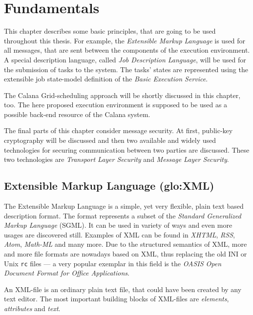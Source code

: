 
\chapter{Fundamentals}
\label{cha:fundamentals}

This chapter  describes some basic principles,  that are going  to be used
throughout this thesis. For example, the \emph{Extensible Markup Language}
is used  for all  messages, that  are sent between  the components  of the
execution  environment. A special  description language,  called \emph{Job
  Description Language}, will  be used for the submission  of tasks to the
system.   The  tasks' states  are  represented  using  the extensible  job
state-model definition of the \emph{Basic Execution Service}.

The  Calana Grid-scheduling  approach will  be shortly  discussed  in this
chapter, too.  The here proposed  execution environment is supposed  to be
used as a possible back-end resource of the Calana system.

The  final parts  of this  chapter  consider message  security. At  first,
public-key  cryptography will  be  discussed and  then  two available  and
widely used  technologies for  securing communication between  two parties
are discussed. These two  technologies are \emph{Transport Layer Security}
and \emph{Message Layer Security}.

\section[Extensible Markup Language]
{Extensible Markup Language (\gls{glo:XML})}

The Extensible Markup Language \cite{xml}  is a simple, yet very flexible,
plain text based description format. The format represents a subset of the
\emph{Standard  Generalized Markup Language}  (SGML).  It  can be  used in
variety of ways and even more usages are discovered still. Examples of XML
can be found in  \emph{XHTML}, \emph{RSS}, \emph{Atom}, \emph{Math-ML} and
many more.   Due to the  structured semantics of  XML, more and  more file
formats are  nowadays based  on XML,  thus replacing the  old INI  or Unix
\texttt{rc}  files  --- a  very  popular exemplar  in  this  field is  the
\emph{OASIS Open Document Format for Office Applications}.

An XML-file is  an ordinary plain text file, that  could have been created
by any text  editor.  The most important building  blocks of XML-files are
\emph{elements}, \emph{attributes} and \emph{text}.


